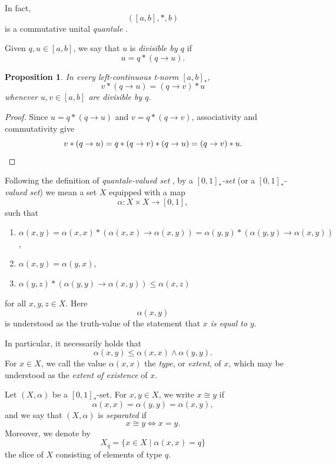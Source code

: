 \documentclass{birkau}
\theoremstyle{plain}
\newtheorem{prop}[thm]{Proposition}
\theoremstyle{definition}
\newcommand{\ra}{\rightarrow}
\newcommand{\al}{\alpha}
\renewcommand{\leq}{\leqslant}
\numberwithin{equation}{section}
\begin{document}
In fact,
\[([a,b],*,b)\]
is a commutative unital \emph{quantale} \cite{Rosenthal1990}. 

Given $q,u\in[a,b]$, we say that $u$ is \emph{divisible by $q$} if
\[u=q*(q\ra u).\]

\begin{prop} \label{divisible} 
In every left-continuous t-norm $[a,b]_*$,
\begin{equation}\label{divisible:u-v-q}
v*(q\ra u)=(q\ra v)*u
\end{equation}
whenever $u,v\in[a,b]$ are divisible by $q$.
\end{prop}

\begin{proof}
Since $u=q*(q\ra u)$ and $v=q*(q\ra v)$, associativity and commutativity give
\[
v*(q\ra u)=q*(q\ra v)*(q\ra u)=(q\ra v)*u.\qedhere
\]
\end{proof}

Following the definition of \emph{quantale-valued set} \cite{Hoehle1992,Hoehle1995b,Hoehle2011a,Pu2012,Lai2020}, by a \emph{$[0,1]_*$-set} (or a \emph{$[0,1]_*$-valued set}) we mean a set $X$ equipped with a map
\[\al\colon X\times X\to[0,1],\]
such that
\begin{enumerate}[label=(S\arabic*)]
\item \label{S1} $\al(x,y)=\al(x,x)*(\al(x,x)\ra\al(x,y))=\al(y,y)*(\al(y,y)\ra\al(x,y))$,
\item \label{S2} $\al(x,y)=\al(y,x)$,
\item \label{S3} $\al(y,z)*(\al(y,y)\ra\al(x,y))\leq\al(x,z)$
\end{enumerate}
for all $x,y,z\in X$. Here 
\[\al(x,y)\] 
is understood as the truth-value of the statement that \emph{$x$ is equal to $y$}. 

In particular, it necessarily holds that
\begin{equation}\label{al(x,y) leq al(x,x) wedge al(y,y)}
\al(x,y)\leq\al(x,x)\wedge\al(y,y).
\end{equation}
For $x\in X$, we call the value $\al(x,x)$ the \emph{type}, or \emph{extent}, of $x$, which may be understood as the \emph{extent of existence} of $x$.

Let $(X,\al)$ be a $[0,1]_*$-set. For $x,y\in X$, we write $x\cong y$ if
\begin{equation} \label{x-cong-y-def}
\al(x,x)=\al(y,y)=\al(x,y),
\end{equation}
and we say that $(X,\al)$ is \emph{separated} if 
\[x\cong y\iff x=y.\]
Moreover, we denote by
\begin{equation} \label{X_q-def}
X_q=\{x\in X\mid\al(x,x)=q\}
\end{equation}
the slice of $X$ consisting of elements of type $q$.
\end{document}
